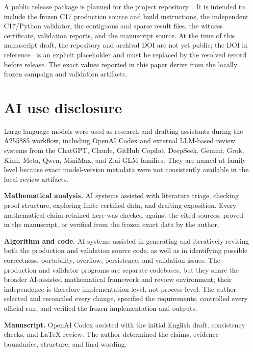 \documentclass[11pt]{article}
\begin{document}
A public release package is planned for the project
repository~\cite{corti-package}.  It is intended to include the frozen C17 production
source and build instructions, the independent C17/Python validator, the
contiguous and sparse result files, the witness certificate, validation
reports, and the manuscript source.  At the time of this manuscript draft,
the repository and archival DOI are not yet public; the DOI in
reference~\cite{corti-package} is an explicit placeholder and must be replaced
by the resolved record before release.  The exact values reported in this
paper derive from the locally frozen campaign and validation artifacts.

\section*{AI use disclosure}

Large language models were used as research and drafting assistants during
the A255885 workflow, including OpenAI Codex and external LLM-based review
systems from the ChatGPT, Claude, GitHub Copilot, DeepSeek, Gemini, Grok,
Kimi, Meta, Qwen, MiniMax, and Z.ai GLM families.  They are named at family
level because exact model-version metadata were not consistently available in
the local review artifacts.

\textbf{Mathematical analysis.}
AI systems assisted with literature
triage, checking proof structure, exploring finite certified data, and
drafting exposition.  Every mathematical claim retained here was checked
against the cited sources, proved in the manuscript, or verified from the
frozen exact data by the author.

\textbf{Algorithm and code.}
AI systems assisted in generating and iteratively revising both the
production and validation source code, as well as in identifying possible
correctness, portability, overflow, persistence, and validation issues.  The
production and validator programs
are separate codebases, but they share the broader AI-assisted mathematical
framework and review environment; their independence is therefore
implementation-level, not process-level.  The author selected and reconciled
every change, specified the requirements, controlled every official run, and
verified the frozen implementation and outputs.

\textbf{Manuscript.}
OpenAI Codex assisted with the initial English draft, consistency checks, and
LaTeX review.  The author determined the claims, evidence boundaries,
structure, and final wording.
\end{document}
